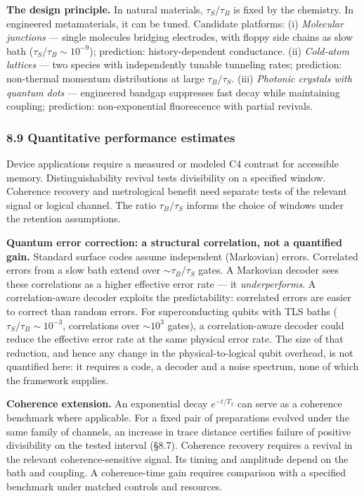 \documentclass[
]{article}
\begin{document}
\textbf{The design principle.} In natural materials, \(\tau_S / \tau_B\)
is fixed by the chemistry. In engineered metamaterials, it can be tuned.
Candidate platforms: (i) \emph{Molecular junctions} --- single molecules
bridging electrodes, with floppy side chains as slow bath
(\(\tau_S / \tau_B \sim 10^{-9}\)); prediction: history-dependent
conductance. (ii) \emph{Cold-atom lattices} --- two species with
independently tunable tunneling rates; prediction: non-thermal momentum
distributions at large \(\tau_B / \tau_S\). (iii) \emph{Photonic
crystals with quantum dots} --- engineered bandgap suppresses fast decay
while maintaining coupling; prediction: non-exponential fluorescence
with partial revivals.

\hypertarget{quantitative-performance-estimates}{%
\subsubsection{8.9 Quantitative performance
estimates}\label{quantitative-performance-estimates}}

Device applications require a measured or modeled C4 contrast for
accessible memory. Distinguishability revival tests divisibility on a
specified window. Coherence recovery and metrological benefit need
separate tests of the relevant signal or logical channel. The ratio
\(\tau_B/\tau_S\) informs the choice of windows under the retention
assumptions.

\textbf{Quantum error correction: a structural correlation, not a
quantified gain.} Standard surface codes assume independent (Markovian)
errors. Correlated errors from a slow bath extend over
\(\sim \tau_B / \tau_S\) gates. A Markovian decoder sees these
correlations as a higher effective error rate --- it
\emph{underperforms}. A correlation-aware decoder exploits the
predictability: correlated errors are easier to correct than random
errors. For superconducting qubits with TLS baths
(\(\tau_S / \tau_B \sim 10^{-3}\), correlations over \(\sim 10^3\)
gates), a correlation-aware decoder could reduce the effective error
rate at the same physical error rate. The size of that reduction, and
hence any change in the physical-to-logical qubit overhead, is not
quantified here: it requires a code, a decoder and a noise spectrum,
none of which the framework supplies.

\textbf{Coherence extension.} An exponential decay \(e^{-t/T_2}\) can
serve as a coherence benchmark where applicable. For a fixed pair of
preparations evolved under the same family of channels, an increase in
trace distance certifies failure of positive divisibility on the tested
interval (§8.7). Coherence recovery requires a revival in the relevant
coherence-sensitive signal. Its timing and amplitude depend on the bath
and coupling. A coherence-time gain requires comparison with a specified
benchmark under matched controls and resources.
\end{document}
